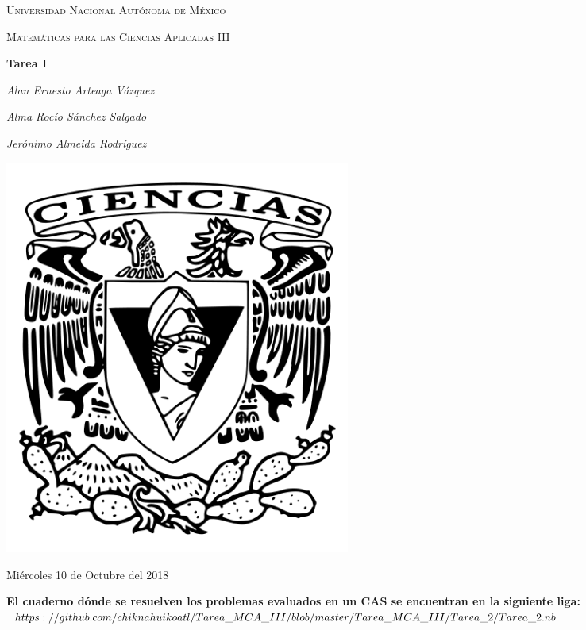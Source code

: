 \documentclass[11pt]{report}
\begin{document}
\newcommand{\BP}[1]{\bigg( #1 \bigg)} %
\newcommand{\Bp}[1]{\Big( #1 \Big)} %
\newcommand{\bp}[1]{\big( #1 \big)} %
\newcommand*\Eval[3]{\left.#1\right\rvert_{#2}^{#3}} %

\newcommand{\tsint}[1]{\int_0^{#1}} %

\begin{titlepage}
	\centering
	{\scshape\LARGE Universidad Nacional Autónoma de México \par}
	\vspace{1cm}
	{\scshape\Large Matemáticas para las Ciencias Aplicadas III\par}
	\vspace{1.5cm}
	{\huge\bfseries Tarea I\par}
	\vspace{.5cm}
	{\Large\itshape Alan Ernesto Arteaga Vázquez \par}
    \vspace{.5cm}
	{\Large\itshape Alma Rocío Sánchez Salgado \par}
    \vspace{.5cm}
	{\Large\itshape Jerónimo Almeida Rodríguez \par}
	\vfill
	 \includegraphics[width=0.5\textwidth]{../escudo_f-ciencias.png}
	\vfill

	{\large Miércoles 10 de Octubre del 2018 \par}
\end{titlepage}


\textbf{El cuaderno dónde se resuelven los problemas evaluados en un CAS se encuentran
		en la siguiente liga:\\
		$https://github.com/chiknahuikoatl/Tarea\_MCA\_III\\
		/blob/master/Tarea\_MCA\_III/Tarea\_2/Tarea\_2.nb$}
\end{document}
